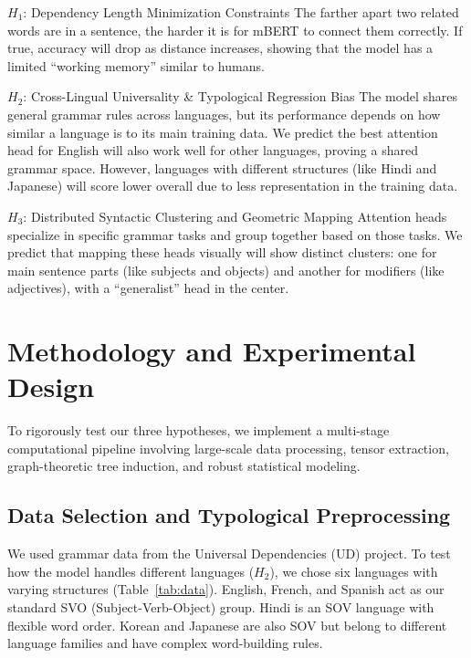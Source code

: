 \documentclass[11pt, a4paper]{article}
\begin{document}
\vspace{1pt}
\begin{hypbox}{$H_1$: Dependency Length Minimization Constraints}
The farther apart two related words are in a sentence, the harder it is for mBERT to connect them correctly. If true, accuracy will drop as distance increases, showing that the model has a limited ``working memory'' similar to humans.
\end{hypbox}
\vspace{3pt}
\begin{hypbox}{$H_2$: Cross-Lingual Universality \& Typological Regression Bias}
The model shares general grammar rules across languages, but its performance depends on how similar a language is to its main training data. We predict the best attention head for English will also work well for other languages, proving a shared grammar space. However, languages with different structures (like Hindi and Japanese) will score lower overall due to less representation in the training data.
\end{hypbox}
\vspace{3pt}
\begin{hypbox}{$H_3$: Distributed Syntactic Clustering and Geometric Mapping}
Attention heads specialize in specific grammar tasks and group together based on those tasks. We predict that mapping these heads visually will show distinct clusters: one for main sentence parts (like subjects and objects) and another for modifiers (like adjectives), with a ``generalist'' head in the center.
\end{hypbox}

\section{Methodology and Experimental Design}

To rigorously test our three hypotheses, we implement a multi-stage computational pipeline involving large-scale data processing, tensor extraction, graph-theoretic tree induction, and robust statistical modeling.

\subsection{Data Selection and Typological Preprocessing}
We used grammar data from the Universal Dependencies (UD) project. To test how the model handles different languages ($H_2$), we chose six languages with varying structures (Table~\ref{tab:data}). English, French, and Spanish act as our standard SVO (Subject-Verb-Object) group. Hindi is an SOV language with flexible word order. Korean and Japanese are also SOV but belong to different language families and have complex word-building rules. 
\end{document}
